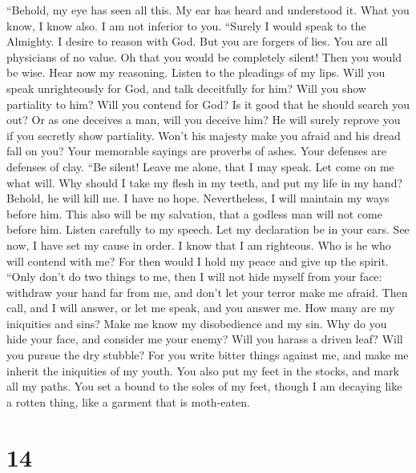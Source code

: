  ``Behold, my eye has seen all this. My ear has heard and
understood it.  What you know, I know also. I am not
inferior to you.  ``Surely I would speak to the Almighty.
I desire to reason with God.  But you are forgers of lies.
You are all physicians of no value.  Oh that you would be
completely silent! Then you would be wise.  Hear now my
reasoning. Listen to the pleadings of my lips.  Will you
speak unrighteously for God, and talk deceitfully for him?
 Will you show partiality to him? Will you contend for
God?  Is it good that he should search you out? Or as one
deceives a man, will you deceive him?  He will surely
reprove you if you secretly show partiality.  Won't his
majesty make you afraid and his dread fall on you?  Your
memorable sayings are proverbs of ashes. Your defenses are defenses of
clay.  ``Be silent! Leave me alone, that I may speak. Let
come on me what will.  Why should I take my flesh in my
teeth, and put my life in my hand?  Behold, he will kill
me. I have no hope. Nevertheless, I will maintain my ways before him.
 This also will be my salvation, that a godless man will
not come before him.  Listen carefully to my speech. Let
my declaration be in your ears.  See now, I have set my
cause in order. I know that I am righteous.  Who is he
who will contend with me? For then would I hold my peace and give up the
spirit.  ``Only don't do two things to me, then I will
not hide myself from your face:  withdraw your hand far
from me, and don't let your terror make me afraid.  Then
call, and I will answer, or let me speak, and you answer me.
 How many are my iniquities and sins? Make me know my
disobedience and my sin.  Why do you hide your face, and
consider me your enemy?  Will you harass a driven leaf?
Will you pursue the dry stubble?  For you write bitter
things against me, and make me inherit the iniquities of my youth.
 You also put my feet in the stocks, and mark all my
paths. You set a bound to the soles of my feet,  though I
am decaying like a rotten thing, like a garment that is moth-eaten.

\hypertarget{section-13}{%
\section{14}\label{section-13}}

